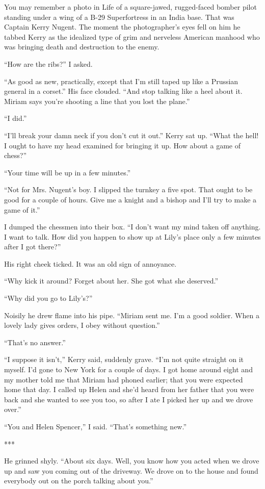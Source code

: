 {You may remember a photo in Life of a square-jawed, rugged-faced bomber pilot standing under a wing of a B-29 Superfortress in an India base. That was Captain Kerry Nugent. The moment the photographer’s eyes fell on him he tabbed Kerry as the idealized type of grim and nerveless American manhood who was bringing death and destruction to the enemy.

“How are the ribs?” I asked.

“As good as new, practically, except that I’m still taped up like a Prussian general in a corset.” His face clouded. “And stop talking like a heel about it. Miriam says you’re shooting a line that you lost the plane.”

“I did.”

“I’ll break your damn neck if you don’t cut it out.” Kerry sat up. “What the hell! I ought to have my head examined for bringing it up. How about a game of chess?”

“Your time will be up in a few minutes.”

“Not for Mrs. Nugent’s boy. I slipped the turnkey a five spot. That ought to be good for a couple of hours. Give me a knight and a bishop and I’ll try to make a game of it.”

I dumped the chessmen into their box. “I don’t want my mind taken off anything. I want to talk. How did you happen to show up at Lily’s place only a few minutes after I got there?”

His right cheek ticked. It was an old sign of annoyance.

“Why kick it around? Forget about her. She got what she deserved.”

“Why did you go to Lily’s?”

Noisily he drew flame into his pipe. “Miriam sent me. I’m a good soldier. When a lovely lady gives orders, I obey without question.”

“That’s no answer.”

“I suppose it isn’t,” Kerry said, suddenly grave. “I’m not quite straight on it myself. I’d gone to New York for a couple of days. I got home around eight and my mother told me that Miriam had phoned earlier; that you were expected home that day. I called up Helen and she’d heard from her father that you were back and she wanted to see you too, so after I ate I picked her up and we drove over.”

“You and Helen Spencer,” I said. “That’s something new.”

***

He grinned shyly. “About six days. Well, you know how you acted when we drove up and saw you coming out of the driveway. We drove on to the house and found everybody out on the porch talking about you.”

}
